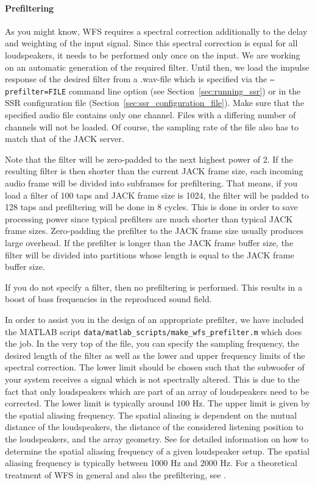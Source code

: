 %
\paragraph{Prefiltering}%
%
As you might know, WFS requires a spectral correction additionally to the delay
and weighting of the input signal. Since this spectral correction is equal for
all loudspeakers, it needs to be performed only once on the input. We are
working on an automatic generation of the required filter. Until then, we load
the impulse response of the desired filter from a .wav-file which is specified
via the \texttt{--prefilter=FILE} command line option (see
Section~\ref{sec:running_ssr}) or in the SSR configuration file
(Section~\ref{sec:ssr_configuration_file}). Make sure that the specified audio
file contains only one channel. Files with a differing number of channels will
not be loaded. Of course, the sampling rate of the file also has to match that
of the JACK server.

Note that the filter will be zero-padded to the next highest power of 2. If the
resulting filter is then shorter than the current JACK frame size, each
incoming audio frame will be divided into subframes for prefiltering. That
means, if you load a filter of 100 taps and JACK frame size is 1024, the filter
will be padded to 128 taps and prefiltering will be done in 8 cycles. This is
done in order to save processing power since typical prefilters are much
shorter than typical JACK frame sizes. Zero-padding the prefilter to the JACK
frame size usually produces large overhead. If the prefilter is longer than the
JACK frame buffer size, the filter will be divided into partitions whose length
is equal to the JACK frame buffer size.

If you do not specify a filter, then no prefiltering is performed. This results
in a boost of bass frequencies in the reproduced sound field.

In order to assist you in the design of an appropriate prefilter, we have
included the MATLAB \cite{matlab} script
\texttt{data/matlab\_scripts/make\_wfs\_prefilter.m} which does the job. In the
very top of the file, you can specify the sampling frequency, the desired
length of the filter as well as the lower and upper frequency limits of the
spectral correction. The lower limit should be chosen such that the subwoofer
of your system receives a signal which is not spectrally altered. This is due
to the fact that only loudspeakers which are part of an array of loudspeakers
need to be corrected. The lower limit is typically around 100 Hz. The upper
limit is given by the spatial aliasing frequency. The spatial aliasing is
dependent on the mutual distance of the loudspeakers, the distance of the
considered listening position to the loudspeakers, and the array geometry. See
\cite{Spors06:Aliasing_AES} for detailed information on how to determine the
spatial aliasing frequency of a given loudspeaker setup. The spatial aliasing
frequency is typically between 1000 Hz and 2000 Hz. For a theoretical treatment
of WFS in general and also the prefiltering, see \cite{Spors08:WFS_AES}.


